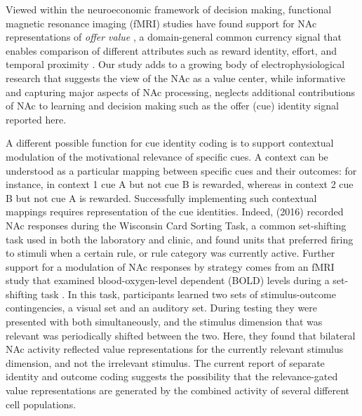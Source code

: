 \documentclass[11pt]{article}
\let\cite=\citep
\providecommand{\DIFadd}[1]{{\protect\color{red} \sf #1}} %
\providecommand{\DIFdel}[1]{} %
\providecommand{\DIFaddbegin}{} %
\providecommand{\DIFaddend}{} %
\providecommand{\DIFdelbegin}{} %
\providecommand{\DIFdelend}{} %
\newcommand{\DIFscaledelfig}{0.5}
\newlength{\DIFdelgraphicswidth} %
\newlength{\DIFdelgraphicsheight} %
\newcommand{\DIFaddincludegraphics}[2][]{{\color{red}\fbox{\DIFOincludegraphics[#1]{#2}}}} %
\newcommand{\DIFdelincludegraphics}[2][]{%
\sbox{\DIFdelgraphicsbox}{\DIFOincludegraphics[#1]{#2}}%
\settoboxwidth{\DIFdelgraphicswidth}{\DIFdelgraphicsbox} %
\settoboxtotalheight{\DIFdelgraphicsheight}{\DIFdelgraphicsbox} %
\scalebox{\DIFscaledelfig}{%
\parbox[b]{\DIFdelgraphicswidth}{\usebox{\DIFdelgraphicsbox}\\[-\baselineskip] \rule{\DIFdelgraphicswidth}{0em}}\llap{\resizebox{\DIFdelgraphicswidth}{\DIFdelgraphicsheight}{%
\setlength{\unitlength}{\DIFdelgraphicswidth}%
\begin{picture}(1,1)%
\thicklines\linethickness{2pt} %
{\color[rgb]{1,0,0}\put(0,0){\framebox(1,1){}}}%
{\color[rgb]{1,0,0}\put(0,0){\line( 1,1){1}}}%
{\color[rgb]{1,0,0}\put(0,1){\line(1,-1){1}}}%
\end{picture}%
}\hspace*{3pt}}} %
} %
\DeclareRobustCommand{\DIFaddbegin}{\DIFOaddbegin \let\includegraphics\DIFaddincludegraphics} %
\DeclareRobustCommand{\DIFaddend}{\DIFOaddend \let\includegraphics\DIFOincludegraphics} %
\DeclareRobustCommand{\DIFdelbegin}{\DIFOdelbegin \let\includegraphics\DIFdelincludegraphics} %
\DeclareRobustCommand{\DIFdelend}{\DIFOaddend \let\includegraphics\DIFOincludegraphics} %
\begin{document}
\DIFaddbegin \DIFadd{Viewed within the neuroeconomic framework of decision making, functional magnetic resonance imaging (fMRI) studies have found support for NAc representations of }{\it \DIFadd{offer value}}\DIFadd{, a domain-general common currency signal that enables comparison of different attributes such as reward identity, effort, and temporal proximity \cite{Peters2009,Levy2012,Bartra2013,Sescousse2015}. Our study adds to a growing body of electrophysiological research that suggests the view of the NAc as a value center, while informative and capturing major aspects of NAc processing, neglects additional contributions of NAc to learning and decision making such as the offer (cue) identity signal reported here.
}

\DIFaddend A different possible function for cue identity coding is to support contextual modulation of the motivational relevance of specific cues. A context can be understood as a particular mapping between specific cues and their outcomes: for instance, in context 1 cue A but not cue B is rewarded, whereas in context 2 cue B but not cue A is rewarded. Successfully implementing such contextual mappings requires representation of the cue identities. Indeed, \citeauthor{Sleezer2016} (2016) recorded NAc responses during the Wisconsin Card Sorting Task, a common set-shifting task used in both the laboratory and clinic, and found units that preferred firing to stimuli when a certain rule, or rule category was currently active. Further support for a modulation of NAc responses by strategy comes from an fMRI study that examined \DIFdelbegin \DIFdel{BOLD }\DIFdelend \DIFaddbegin \DIFadd{blood-oxygen-level dependent (BOLD) }\DIFaddend levels during a set-shifting task \cite{Fitzgerald2014}. In this task, participants learned two sets of stimulus-outcome contingencies, a visual set and an auditory set. During testing they were presented with both simultaneously, and the stimulus dimension that was relevant was periodically shifted between the two. Here, they found that bilateral NAc activity reflected value representations for the currently relevant stimulus dimension, and not the irrelevant stimulus. The current \DIFdelbegin \DIFdel{finding of separate , but
overlapping, populations of units encoding cue identity and expected
outcome , suggests that the fMRI finding is }\DIFdelend \DIFaddbegin \DIFadd{report of separate identity and outcome coding suggests the possibility that the relevance-gated value representations are }\DIFaddend generated by the combined activity of several different \DIFdelbegin \DIFdel{functional cell types}\DIFdelend \DIFaddbegin \DIFadd{cell populations}\DIFaddend .
\end{document}
